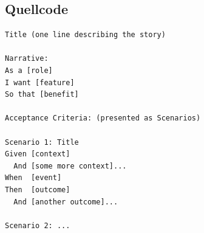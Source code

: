 \subsection{Quellcode}
\vspace{0.5cm}
\begin{lstlisting}[caption = {Vorlage für eine Story und Szenarien nach BDD}, label = {lst:bdd-stories-szenarien-template}, style = kit-cm, language = Gherkin]
Title (one line describing the story)
 
Narrative:
As a [role]
I want [feature]
So that [benefit]
 
Acceptance Criteria: (presented as Scenarios)
 
Scenario 1: Title
Given [context]
  And [some more context]...
When  [event]
Then  [outcome]
  And [another outcome]...
 
Scenario 2: ...
\end{lstlisting}
\fi

